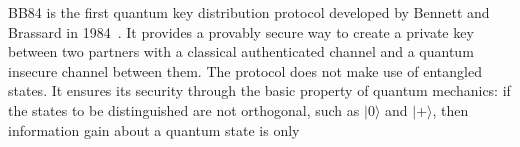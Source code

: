 \documentclass[a4paper,UKenglish,cleveref, autoref]{lipics-v2019}
\begin{document}
BB84 is the first quantum key distribution protocol developed by Bennett and Brassard in
1984~\cite{BB84}. It provides a provably secure way to create a private key between two partners with a classical authenticated channel and a quantum insecure
channel between them. The protocol does not make use of entangled states. It ensures its security through the basic property of quantum mechanics: if the states to be distinguished are not orthogonal, such as $|0\rangle$ and $|+\rangle$, then information gain about a quantum state is only
\end{document}
